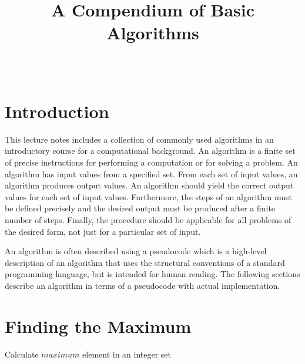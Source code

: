 \documentclass[journal]{IEEEtran}
\begin{document}
\title{A Compendium of Basic Algorithms}

\author{\\
}

\maketitle

\section{Introduction}
This lecture notes includes a collection of commonly
used algorithms in an introductory course for a computational background.
An algorithm is a finite set of precise instructions 
for performing a computation or for solving a problem.
An algorithm has input values from a specified set.
From each set of input values, an algorithm produces output values.
An algorithm should yield the correct output values for each set of input values.
Furthermore, the steps of an algorithm must be defined precisely and the desired
output must be produced after a finite number of steps.
Finally, the procedure should be applicable for all problems of the desired form, not just for a
particular set of input.

An algorithm is often described using a pseudocode which is a high-level description of an algorithm that uses the structural conventions of a standard programming language, but is intended for human reading. The following sections describe an algorithm in terms of a pseudocode with actual implementation.


\section{Finding the Maximum}
 

\begin{algorithm}
  \caption{\color{green(html/cssgreen)}Calculate $maximum$ element in an integer set}
  \label{alg1}
  \color{green(html/cssgreen)}
  \begin{algorithmic}
    
  \end{algorithmic}
\end{algorithm}
\end{document}
